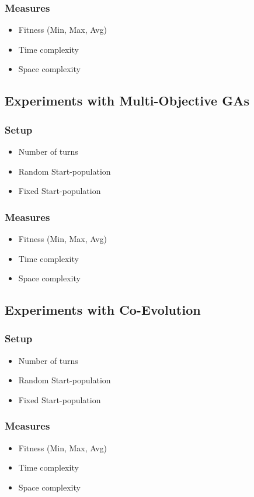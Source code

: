 \subsubsection{Measures}
\begin{itemize}
    \item Fitness (Min, Max, Avg)
    \item Time complexity
    \item Space complexity
\end{itemize}

\subsection{Experiments with Multi-Objective GAs}
\subsubsection{Setup}
\begin{itemize}
    \item Number of turns
    \item Random Start-population
    \item Fixed Start-population
\end{itemize}
\subsubsection{Measures}
\begin{itemize}
    \item Fitness (Min, Max, Avg)
    \item Time complexity
    \item Space complexity
\end{itemize}

\subsection{Experiments with Co-Evolution}
\subsubsection{Setup}
\begin{itemize}
    \item Number of turns
    \item Random Start-population
    \item Fixed Start-population
\end{itemize}
\subsubsection{Measures}
\begin{itemize}
    \item Fitness (Min, Max, Avg)
    \item Time complexity
    \item Space complexity
\end{itemize}

